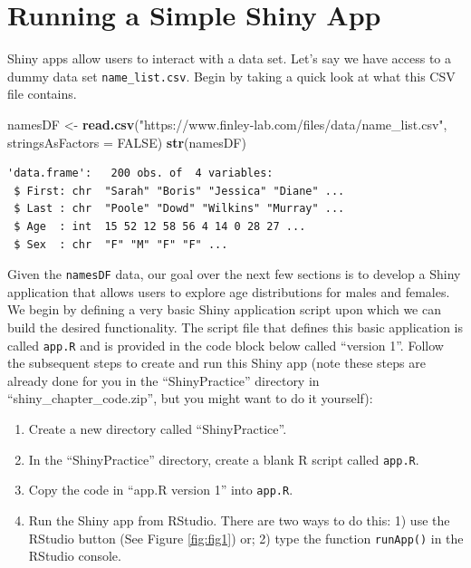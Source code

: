 \documentclass[
]{krantz}
\makeatletter
\newenvironment{Shaded}{\begin{snugshade}}{\end{snugshade}}
\newcommand{\DataTypeTok}[1]{\textcolor[rgb]{0.27,0.27,0.27}{#1}}
\newcommand{\KeywordTok}[1]{\textcolor[rgb]{0.27,0.27,0.27}{\textbf{#1}}}
\newcommand{\NormalTok}[1]{#1}
\newcommand{\OtherTok}[1]{\textcolor[rgb]{0.37,0.37,0.37}{#1}}
\newcommand{\StringTok}[1]{\textcolor[rgb]{0.5,0.5,0.5}{#1}}
\providecommand{\tightlist}{%
  \setlength{\itemsep}{0pt}\setlength{\parskip}{0pt}}
\newenvironment{kframe}{%
\medskip{}
\setlength{\fboxsep}{.8em}
 \def\at@end@of@kframe{}%
 \ifinner\ifhmode%
  \def\at@end@of@kframe{\end{minipage}}%
  \begin{minipage}{\columnwidth}%
 \fi\fi%
 \def\FrameCommand##1{\hskip\@totalleftmargin \hskip-\fboxsep
 \colorbox{shadecolor}{##1}\hskip-\fboxsep
     \hskip-\linewidth \hskip-\@totalleftmargin \hskip\columnwidth}%
 \MakeFramed {\advance\hsize-\width
   \@totalleftmargin\z@ \linewidth\hsize
   \@setminipage}}%
 {\par\unskip\endMakeFramed%
 \at@end@of@kframe}
\renewenvironment{Shaded}{\begin{kframe}}{\end{kframe}}
\makeatother
\begin{document}
\hypertarget{running-a-simple-shiny-app}{%
\section{Running a Simple Shiny App}\label{running-a-simple-shiny-app}}

Shiny apps allow users to interact with a data set. Let's say we have access to a dummy data set \texttt{name\_list.csv}. Begin by taking a quick look at what this CSV file contains.

\begin{Shaded}
\begin{Highlighting}[]
\NormalTok{namesDF \textless{}{-}}\StringTok{ }\KeywordTok{read.csv}\NormalTok{(}\StringTok{"https://www.finley{-}lab.com/files/data/name\_list.csv"}\NormalTok{, }
                    \DataTypeTok{stringsAsFactors =} \OtherTok{FALSE}\NormalTok{)}
\KeywordTok{str}\NormalTok{(namesDF)}
\end{Highlighting}
\end{Shaded}

\begin{verbatim}
'data.frame':   200 obs. of  4 variables:
 $ First: chr  "Sarah" "Boris" "Jessica" "Diane" ...
 $ Last : chr  "Poole" "Dowd" "Wilkins" "Murray" ...
 $ Age  : int  15 52 12 58 56 4 14 0 28 27 ...
 $ Sex  : chr  "F" "M" "F" "F" ...
\end{verbatim}

Given the \texttt{namesDF} data, our goal over the next few sections is to develop a Shiny application that allows users to explore age distributions for males and females. We begin by defining a very basic Shiny application script upon which we can build the desired functionality. The script file that defines this basic application is called \texttt{app.R} and is provided in the code block below called ``version 1''. Follow the subsequent steps to create and run this Shiny app (note these steps are already done for you in the ``ShinyPractice'' directory in ``shiny\_chapter\_code.zip'', but you might want to do it yourself):

\begin{enumerate}
\def\labelenumi{\arabic{enumi}.}
\tightlist
\item
  Create a new directory called ``ShinyPractice''.
\item
  In the ``ShinyPractice'' directory, create a blank R script called \texttt{app.R}.
\item
  Copy the code in ``app.R version 1'' into \texttt{app.R}.
\item
  Run the Shiny app from RStudio. There are two ways to do this: 1) use the RStudio button (See Figure \ref{fig:fig1}) or; 2) type the function \texttt{runApp()} in the RStudio console.
\end{enumerate}
\end{document}
